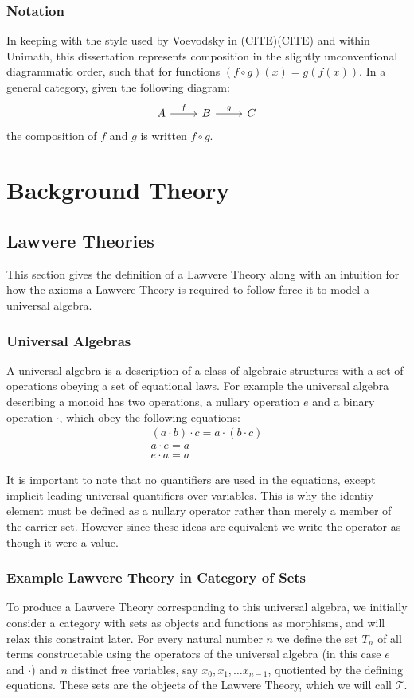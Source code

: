 \documentclass[12pt,a4paper,twoside,openright]{report}
\begin{document}
\subsection*{Notation}
In keeping with the style used by Voevodsky in (CITE)(CITE) and within Unimath,
this dissertation represents composition in the slightly unconventional
diagrammatic order, such that for functions $(f\circ g)(x) = g(f(x))$. In a
general category, given the following diagram:
\[
\begin{tikzcd}
    A\ar[r,"f"]&B\ar[r,"g"]&C
\end{tikzcd}
\]
the composition of $f$ and $g$ is written $f\circ g$.

\chapter{Background Theory}
\section{Lawvere Theories}
This section gives the definition of a Lawvere Theory along with an intuition
for how the axioms a Lawvere Theory is required to follow force it to model a
universal algebra. 

\subsection{Universal Algebras}
A universal algebra is a description of a class of algebraic structures with a
set of operations obeying a set of equational laws. For example the universal
algebra describing a monoid has two operations, a nullary operation $e$ and a
binary operation $\cdot$, which obey the following equations:
\begin{gather*}
    (a\cdot b)\cdot c = a\cdot (b\cdot c) \\
    a \cdot e = a \\
    e \cdot a = a
\end{gather*}

It is important to note that no quantifiers are used in the equations, except
implicit leading universal quantifiers over variables. This is why the identiy
element must be defined as a nullary operator rather than merely a member of the
carrier set. However since these ideas are equivalent we write the operator as
though it were a value.

\subsection{Example Lawvere Theory in Category of Sets}
To produce a Lawvere Theory corresponding to this universal algebra, we
initially consider a category with sets as objects and functions as morphisms,
and will relax this constraint later. For every natural number $n$ we define the
set $T_n$ of all terms constructable using the operators of the universal
algebra (in this case $e$ and $\cdot$) and $n$ distinct free variables, say
$x_0, x_1,\ldots x_{n-1}$, quotiented by the defining equations. These sets are
the objects of the Lawvere Theory, which we will call $\mathcal{T}$.
\end{document}
